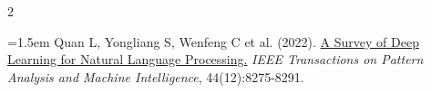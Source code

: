 \documentclass[a4paper,10pt,twoside]{article}
\begin{document}
\begin{multicols}{2}
{            \noindent\hangindent=1.5em
                    Quan L, Yongliang S, Wenfeng C et al.
                (2022).
                    \href{https://ieeexplore.ieee.org/abstract/document/9530071/}{A Survey of Deep Learning for Natural Language Processing.}
                \textit{IEEE Transactions on Pattern Analysis and Machine Intelligence},
                    44(12):8275-8291.
                \par\vspace{3pt}

            }

\end{multicols}
\end{document}
